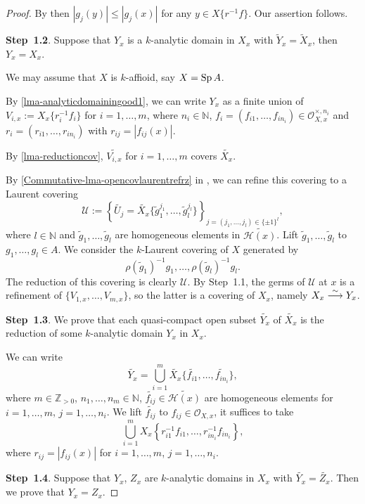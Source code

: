 \begin{proof}
    By then $|g_j(y)|\leq |g_j(x)|$ for any $y\in X\{r^{-1}f\}$. Our assertion follows.

    \textbf{Step~1.2}. Suppose that $Y_x$ is a $k$-analytic domain in $X_x$ with $\tilde{Y}_x=\tilde{X}_x$, then $Y_x= X_x$.

    We may assume that $X$ is $k$-affioid, say $X=\operatorname{Sp} A$.

    By \cref{lma-analyticdomainingood1}, we can write $Y_x$ as a finite union of $V_{i,x}:=X_x\{r_i^{-1}f_i\}$ for $i=1,\ldots,m$, where $n_i\in \mathbb{N}$, $f_i=(f_{i1},\ldots,f_{in_i})\in \mathcal{O}_{X,x}^{\times,n_i}$ and $r_i=(r_{i1},\ldots,r_{in_i})$ with $r_{ij}=|f_{ij}(x)|$.

    By \cref{lma-reductioncov}, $\widetilde{V_{i,x}}$ for $i=1,\ldots,m$ covers $\widetilde{X_x}$.

    By \cref{Commutative-lma-opencovlaurentrefrz} in , we can refine this covering to a Laurent covering 
    \[
        \mathcal{U}:=\left\{\tilde{U_j}=\widetilde{X_x}\{\tilde{g}^{j_1}_1,\ldots,\tilde{g}^{j_l}_l\}\right\}_{j=(j_1,\ldots,j_l)\in \{\pm 1\}^l },
    \]
    where $l\in \mathbb{N}$ and $\tilde{g}_1,\ldots,\tilde{g}_l$ are homogeneous elements in $\widetilde{\mathscr{H}(x)}$. Lift $\tilde{g}_1,\ldots,\tilde{g}_l$ to $g_1,\ldots,g_l\in A$. We consider the $k$-Laurent covering of $X$ generated by 
    \[
        \rho(\tilde{g}_1)^{-1}g_1,\ldots,\rho(\tilde{g}_l)^{-1}g_l.  
    \]
    The reduction of this covering is clearly $\mathcal{U}$. By Step~1.1, the germs of $\mathcal{U}$ at $x$ is a refinement of $\{V_{1,x},\ldots,V_{m,x}\}$, so the latter is a covering of $X_x$, namely $X_x\stackrel{\sim}{\longrightarrow} Y_x$.

    \textbf{Step~1.3}. We prove that each quasi-compact open subset $\widetilde{Y_x}$ of $\widetilde{X_x}$ is the reduction of some $k$-analytic domain $Y_x$ in $X_x$.

    We can write 
    \[
        \widetilde{Y_x}=\bigcup_{i=1}^m \widetilde{X_x}\{\widetilde{f_{i1}},\ldots,\widetilde{f_{in_i}}\},  
    \]
    where $m\in \mathbb{Z}_{>0}$, $n_1,\ldots,n_m\in \mathbb{N}$, $\widetilde{f_{ij}}\in \widetilde{\mathscr{H}(x)}$ are homogeneous elements for $i=1,\ldots,m$, $j=1,\ldots,n_i$.
    We lift $\widetilde{f_{ij}}$ to $f_{ij}\in \mathcal{O}_{X,x}$, it suffices to take 
    \[
        \bigcup_{i=1}^m X_x\left\{r_{i1}^{-1}f_{i1},\ldots, r_{in_i}^{-1}f_{in_i} \right\},  
    \]
    where $r_{ij}=|f_{ij}(x)|$ for $i=1,\ldots,m$, $j=1,\ldots,n_i$.

    \textbf{Step~1.4}. Suppose that $Y_x$, $Z_x$ are $k$-analytic domains in $X_x$ with $\widetilde{Y_x}=\widetilde{Z_x}$. Then we prove that $Y_x=Z_x$.


\end{proof}
